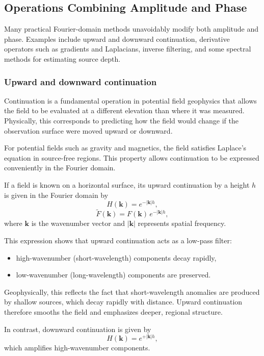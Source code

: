 \subsection{Operations Combining Amplitude and Phase}

Many practical Fourier-domain methods unavoidably modify both amplitude and phase. Examples include upward and downward continuation, derivative operators such as gradients and Laplacians, inverse filtering, and some spectral methods for estimating source depth.

\subsubsection{Upward and downward continuation}\label{sec:continuation}

Continuation is a fundamental operation in potential field geophysics that allows the field to be evaluated at a different elevation than where it was measured. Physically, this corresponds to predicting how the field would change if the observation surface were moved upward or downward.

For potential fields such as gravity and magnetics, the field satisfies Laplace's equation in source-free regions. This property allows continuation to be expressed conveniently in the Fourier domain.

If a field is known on a horizontal surface, its upward continuation by a height $h$ is given in the Fourier domain by
\[
    H(\mathbf{k}) = e^{-|\mathbf{k}|h},
\]
\[
    \tilde{F}(\mathbf{k}) = F(\mathbf{k})\, e^{-|\mathbf{k}|h},
\]
where $\mathbf{k}$ is the wavenumber vector and $|\mathbf{k}|$ represents spatial frequency.

This expression shows that upward continuation acts as a low-pass filter:
\begin{itemize}
    \item high-wavenumber (short-wavelength) components decay rapidly,
    \item low-wavenumber (long-wavelength) components are preserved.
\end{itemize}

Geophysically, this reflects the fact that short-wavelength anomalies are produced by shallow sources, which decay rapidly with distance. Upward continuation therefore smooths the field and emphasizes deeper, regional structure.

In contrast, downward continuation is given by
\[
    H(\mathbf{k}) = e^{+|\mathbf{k}|h},
\]
which amplifies high-wavenumber components.

